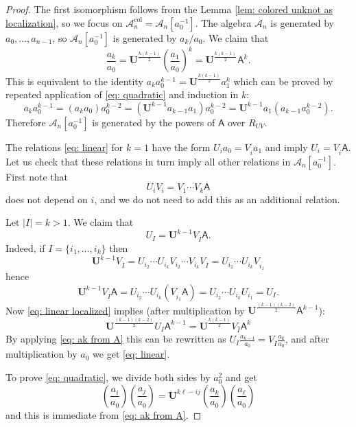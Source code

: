 \documentclass{amsart}
\newcommand{\CA}{\mathcal{A}}
\newcommand{\col}{\mathrm{col}}
\newcommand{\UU}{\mathbf{U}}
\newcommand{\AAA}{\mathsf{A}}
\begin{document}
\begin{proof}
The first isomorphism follows from the Lemma \ref{lem: colored unknot as localization}, so we focus on $\CA_n^{\col}=\CA_n[a_0^{-1}]$.
The algebra  $\CA_n$ is generated by $a_0,\ldots,a_{n-1}$, so $\CA_n[a_0^{-1}]$ is generated by $a_k/a_0$. We claim that
\begin{equation}
\label{eq: ak from A}
\frac{a_k}{a_0}=\UU^{\frac{k(k-1)}{2}}\left(\frac{a_1}{a_0}\right)^k=\UU^{\frac{k(k-1)}{2}}\AAA^k.
\end{equation}
This is equivalent to the identity $a_ka_0^{k-1}=\UU^{\frac{k(k-1)}{2}}a_1^{k}$ which can be proved by repeated application of \eqref{eq: quadratic} and induction in $k$:
$$
a_ka_0^{k-1}=(a_ka_0)a_0^{k-2}=(\UU^{k-1}a_{k-1}a_1)a_0^{k-2}=\UU^{k-1}a_1(a_{k-1}a_0^{k-2}).
$$
Therefore $\CA_n[a_0^{-1}]$ is generated by the powers of $\AAA$ over $R_{UV}$. 

The relations \eqref{eq: linear} for $k=1$ have the form $U_ia_0=V_{\overline{i}}a_1$ and imply $U_i=V_{\overline{i}}\AAA$. Let us check that these relations in turn imply all other relations in $\CA_n[a_0^{-1}]$. First note that 
$$
U_iV_i=V_1\cdots V_k\AAA
$$
does not depend on $i$, and we do not need to add this as an additional relation.

Let $|I|=k>1$. We claim that 
\begin{equation}
\label{eq: linear localized}
U_I=\UU^{k-1}V_{\overline{I}}\AAA.
\end{equation}
Indeed, if $I=\{i_1,\ldots,i_k\}$ then 
$$
\UU^{k-1}V_{\overline{I}}=U_{i_2}\cdots U_{i_k}V_{i_2}\cdots V_{i_k}V_{\overline{I}}=U_{i_2}\cdots U_{i_k}V_{\overline{i_1}}
$$
hence
$$
\UU^{k-1}V_{\overline{I}}\AAA=U_{i_2}\cdots U_{i_k}(V_{\overline{i_1}}\AAA)=U_{i_2}\cdots U_{i_k}U_{i_1}=U_I.
$$
Now \eqref{eq: linear localized} implies (after multiplication by $\UU^{\frac{(k-1)(k-2)}{2}}\AAA^{k-1}$):
$$
\UU^{\frac{(k-1)(k-2)}{2}}U_I\AAA^{k-1}=\UU^{\frac{k(k-1)}{2}}V_{\overline{I}}\AAA^{k}
$$
By applying \eqref{eq: ak from A} this can be rewritten as $U_I\frac{a_{k-1}}{a_0}=V_{\overline{I}}\frac{a_k}{a_0}$, and after multiplication by $a_0$ we get \eqref{eq: linear}.

To prove \eqref{eq: quadratic}, we divide both sides by $a_0^2$ and get 
$$
\left(\frac{a_i}{a_0}\right)\left(\frac{a_j}{a_0}\right)=\UU^{k\ell-ij}\left(\frac{a_k}{a_0}\right)\left(\frac{a_{\ell}}{a_0}\right)
$$
and this is immediate from \eqref{eq: ak from A}.

\end{proof}
\end{document}

